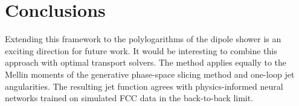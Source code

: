 \section{Conclusions}\label{sec:conclusions}

Extending this framework to the polylogarithms of the dipole shower is
an exciting direction for future work. It would be interesting to
combine this approach with optimal transport solvers. The method applies
equally to the Mellin moments of the generative phase-space slicing
method and one-loop jet angularities. The resulting jet function agrees
with physics-informed neural networks trained on simulated FCC data in
the back-to-back limit.

